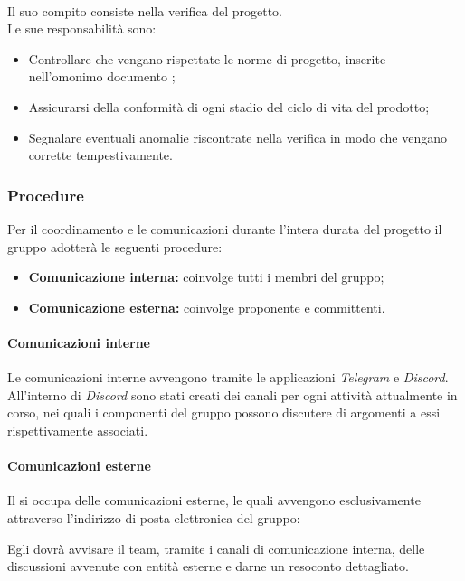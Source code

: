       \paragraph{\roleVerifier}
        Il suo compito consiste nella verifica del progetto.\\
        Le sue responsabilità sono:
        \begin{itemize}
          \item Controllare che vengano rispettate le norme di progetto, inserite nell'omonimo documento \docNameVersionNdP{};
          \item Assicurarsi della conformità di ogni stadio del ciclo di vita del prodotto;
          \item Segnalare eventuali anomalie riscontrate nella verifica in modo che vengano corrette tempestivamente.
        \end{itemize}
  \subsubsection {Procedure}
  Per il coordinamento e le comunicazioni durante l'intera durata del progetto il gruppo \groupName{} adotterà le seguenti procedure:
  \begin{itemize}
    \item \textbf{Comunicazione interna:} coinvolge tutti i membri del gruppo;
    \item  \textbf{Comunicazione esterna:} coinvolge proponente e committenti.
  \end{itemize}
  \paragraph{Comunicazioni interne}
  Le comunicazioni interne avvengono tramite le applicazioni \textit{Telegram}\glo{} e \textit{Discord}\glo{}. All'interno di \textit{Discord} sono stati creati dei canali per ogni attività attualmente in corso, nei quali i componenti del gruppo possono discutere di argomenti a essi rispettivamente associati.
  \paragraph{Comunicazioni esterne}
  Il \roleProjectManagerLow{} si occupa delle comunicazioni esterne, le quali avvengono esclusivamente attraverso l'indirizzo di posta elettronica del gruppo:
  \begin{center}
    \groupEmail{}
  \end{center}
  Egli dovrà avvisare il team, tramite i canali di comunicazione interna, delle discussioni avvenute con entità esterne e darne un resoconto dettagliato.
 
